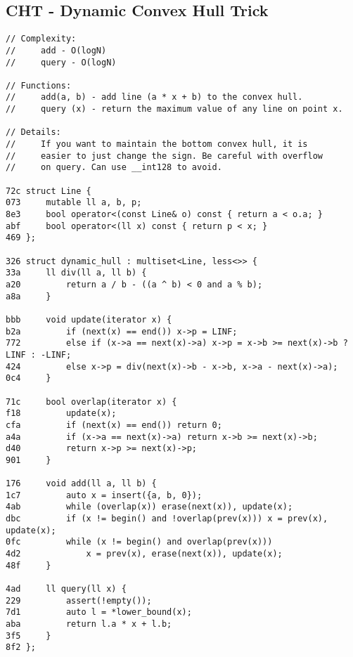 \documentclass[11pt, a4paper, twoside]{article}
\begin{document}
\subsection{CHT - Dynamic Convex Hull Trick}
\begin{lstlisting}
// Complexity: 
//     add - O(logN)
//     query - O(logN)

// Functions:
//     add(a, b) - add line (a * x + b) to the convex hull.
//     query (x) - return the maximum value of any line on point x.

// Details:
//     If you want to maintain the bottom convex hull, it is
//     easier to just change the sign. Be careful with overflow
//     on query. Can use __int128 to avoid.

72c struct Line {
073     mutable ll a, b, p;
8e3     bool operator<(const Line& o) const { return a < o.a; }
abf     bool operator<(ll x) const { return p < x; }
469 };

326 struct dynamic_hull : multiset<Line, less<>> {
33a     ll div(ll a, ll b) { 
a20         return a / b - ((a ^ b) < 0 and a % b);
a8a     }
        
bbb     void update(iterator x) {
b2a         if (next(x) == end()) x->p = LINF;
772         else if (x->a == next(x)->a) x->p = x->b >= next(x)->b ? LINF : -LINF;
424         else x->p = div(next(x)->b - x->b, x->a - next(x)->a);
0c4     }
    
71c     bool overlap(iterator x) {
f18         update(x);
cfa         if (next(x) == end()) return 0;
a4a         if (x->a == next(x)->a) return x->b >= next(x)->b;
d40         return x->p >= next(x)->p;
901     }
            
176     void add(ll a, ll b) {
1c7         auto x = insert({a, b, 0});
4ab         while (overlap(x)) erase(next(x)), update(x);
dbc         if (x != begin() and !overlap(prev(x))) x = prev(x), update(x);
0fc         while (x != begin() and overlap(prev(x))) 
4d2             x = prev(x), erase(next(x)), update(x);
48f     }
        
4ad     ll query(ll x) {
229         assert(!empty());
7d1         auto l = *lower_bound(x);
aba         return l.a * x + l.b;
3f5     }
8f2 };
\end{lstlisting}




\end{document}
